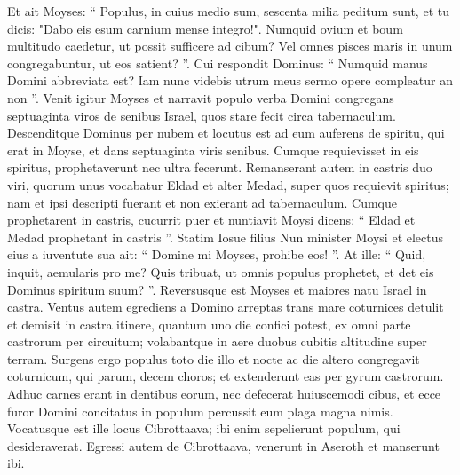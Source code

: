 \begin{biblechapter}
\begin{biblechapter}
\begin{biblechapter}
\begin{biblechapter}
\begin{biblechapter}
\begin{biblechapter}
\begin{biblechapter}
\begin{biblechapter}
\begin{biblechapter}
\begin{biblechapter}
\begin{biblechapter}
\verse Et ait Moyses: “ Populus, in cuius medio sum, sescenta milia peditum sunt, et tu dicis: "Dabo eis esum carnium mense integro!". 
\verse Numquid ovium et boum multitudo caedetur, ut possit sufficere ad cibum? Vel omnes pisces maris in unum congregabuntur, ut eos satient? ”. 
\verse Cui respondit Dominus: “ Numquid manus Domini abbreviata est? Iam nunc videbis utrum meus sermo opere compleatur an non ”.
 \verse Venit igitur Moyses et narravit populo verba Domini congregans septuaginta viros de senibus Israel, quos stare fecit circa tabernaculum. 
\verse Descenditque Dominus per nubem et locutus est ad eum auferens de spiritu, qui erat in Moyse, et dans septuaginta viris senibus. Cumque requievisset in eis spiritus, prophetaverunt nec ultra fecerunt. 
\verse Remanserant autem in castris duo viri, quorum unus vocabatur Eldad et alter Medad, super quos requievit spiritus; nam et ipsi descripti fuerant et non exierant ad tabernaculum. Cumque prophetarent in castris, 
\verse cucurrit puer et nuntiavit Moysi dicens: “ Eldad et Medad prophetant in castris ”. 
\verse Statim Iosue filius Nun minister Moysi et electus eius a iuventute sua ait: “ Domine mi Moyses, prohibe eos! ”. 
\verse At ille: “ Quid, inquit, aemularis pro me? Quis tribuat, ut omnis populus prophetet, et det eis Dominus spiritum suum? ”. 
\verse Reversusque est Moyses et maiores natu Israel in castra.
 \verse Ventus autem egrediens a Domino arreptas trans mare coturnices detulit et demisit in castra itinere, quantum uno die confici potest, ex omni parte castrorum per circuitum; volabantque in aere duobus cubitis altitudine super terram. 
\verse Surgens ergo populus toto die illo et nocte ac die altero congregavit coturnicum, qui parum, decem choros; et extenderunt eas per gyrum castrorum. 
\verse Adhuc carnes erant in dentibus eorum, nec defecerat huiuscemodi cibus, et ecce furor Domini concitatus in populum percussit eum plaga magna nimis. 
\verse Vocatusque est ille locus Cibrottaava; ibi enim sepelierunt populum, qui desideraverat.
 \verse Egressi autem de Cibrottaava, venerunt in Aseroth et manserunt ibi.
 

\end{biblechapter}
\end{biblechapter}
\end{biblechapter}
\end{biblechapter}
\end{biblechapter}
\end{biblechapter}
\end{biblechapter}
\end{biblechapter}
\end{biblechapter}
\end{biblechapter}
\end{biblechapter}
